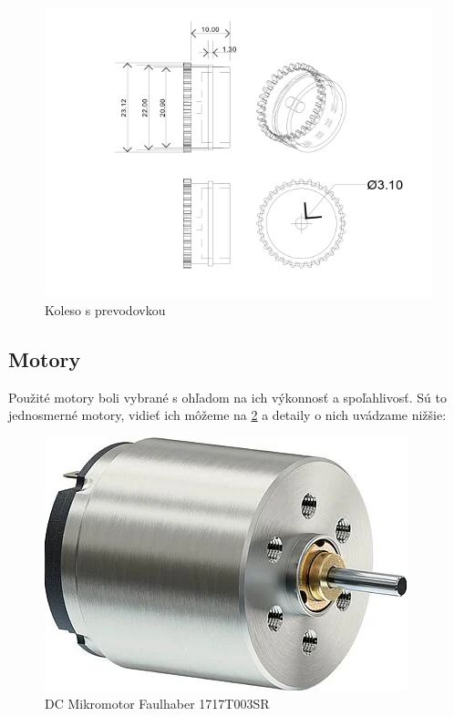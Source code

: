 \begin{figure}[!htbp]
        \centering
        \includegraphics[scale=0.8]{includes/images/wheel_w_gear_2_blueprint.png}
        \caption{Koleso s prevodovkou}
        \label{fig:wheel_w_gear}
\end{figure}
\newpage
\subsection{Motory}\label{motor_section}
Použité motory boli vybrané s ohľadom na ich výkonnosť a spoľahlivosť. Sú to jednosmerné motory, vidieť ich môžeme na \ref{fig:motor} a detaily o nich uvádzame nižšie:

\begin{figure}[!htbp]
        \centering
        \includegraphics[scale=0.8]{includes/images/faulhaber.png}
        \caption{DC Mikromotor Faulhaber 1717T003SR}
        \label{fig:motor}
\end{figure}


